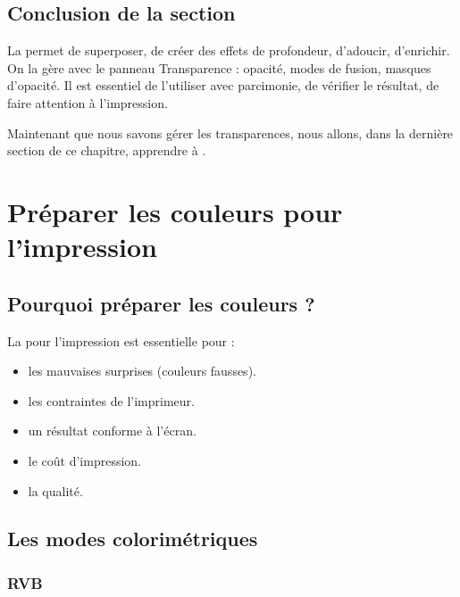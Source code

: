 \subsection*{Conclusion de la section}

La  permet de superposer, de créer des effets de profondeur, d'adoucir, d'enrichir. On la gère avec le panneau Transparence : opacité, modes de fusion, masques d'opacité. Il est essentiel de l'utiliser avec parcimonie, de vérifier le résultat, de faire attention à l'impression.

Maintenant que nous savons gérer les transparences, nous allons, dans la dernière section de ce chapitre, apprendre à .

\section{Préparer les couleurs pour l'impression}

\subsection{Pourquoi préparer les couleurs ?}

La  pour l'impression est essentielle pour :

\begin{itemize}
    \item {} les mauvaises surprises (couleurs fausses).
    \item {} les contraintes de l'imprimeur.
    \item {} un résultat conforme à l'écran.
    \item {} le coût d'impression.
    \item {} la qualité.
\end{itemize}

\subsection{Les modes colorimétriques}

\subsubsection{RVB}

